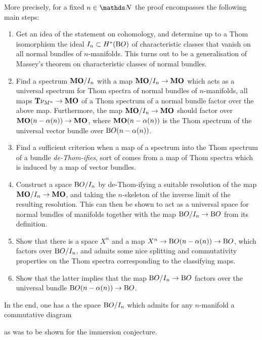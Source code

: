 More precisely, for a fixed $n\in\Nat$ the proof
encompasses the following main steps:
\begin{enumerate}[1.]
\item
  Get an idea of the statement on cohomology, and determine up to a
  Thom isomorphism the ideal $I_{n}\subset H^*(\mathrm{B}O)$ of characteristic
  classes that vanish on all normal bundles of $n$-manifolds.
  This turns out to be a generalisation of Massey's theorem on
  characteristic classes of normal bundles.
\item
  Find a spectrum $\bm{\mathrm{MO}}/I_{n}$ with a map
  $\bm{\mathrm{MO}}/I_{n}\to\bm{\mathrm{MO}}$ which acts as a universal
  spectrum for Thom spectra of normal bundles of $n$-manifolds,
  \idest all maps $\bm{\mathrm{T}}{\nu_{M^n}}\to \bm{\mathrm{MO}}$ of a Thom spectrum of a
  normal bundle factor over the above map.
  Furthermore, the map $\bm{\mathrm{MO}}/I_{n}\to\bm{\mathrm{MO}}$ should factor
  over $\bm{\mathrm{MO}}(n-\alpha(n))\to\bm{\mathrm{MO}}$, where $\bm{\mathrm{MO}}(n-\alpha(n))$
  is the Thom spectrum of the universal vector bundle
  over $\mathrm{B}O(n-\alpha(n))$.
\item
  Find a sufficient criterion when a map of a spectrum into the Thom
  spectrum of a bundle \emph{de-Thom-ifies}, \idest sort of
  comes from a map of Thom spectra which is induced by a map
  of vector bundles.
\item
  Construct a space $\mathrm{B}O/I_{n}$ by de-Thom-ifying a suitable resolution
  of the map $\bm{\mathrm{MO}}/I_{n}\to\bm{\mathrm{MO}}$, and taking the
  $n$-skeleton of the inverse limit of the resulting resolution.
  This can then be shown to act as a universal space for normal
  bundles of manifolds together with the map $\mathrm{B}O/I_{n}\to\mathrm{B}O$ from its
  definition.
\item
  Show that there is a space $X^n$ and a map
  $X^n\to\mathrm{B}O(n-\alpha(n))\to\mathrm{B}O$,
  which factors over $\mathrm{B}O/I_{n}$, and admits some nice splitting and
  commutativity properties on the Thom spectra corresponding to the
  classifying maps.
\item
  Show that the latter implies that
  the map $\mathrm{B}O/I_{n}\to\mathrm{B}O$ factors over the universal bundle
  $\mathrm{B}O(n-\alpha(n))\to\mathrm{B}O$.
\end{enumerate}
In the end, one has a the space $\mathrm{B}O/I_{n}$ which admits for
any $n$-manifold a commutative diagram
\begin{center}
\end{center}
as was to be shown for the immersion conjecture.

